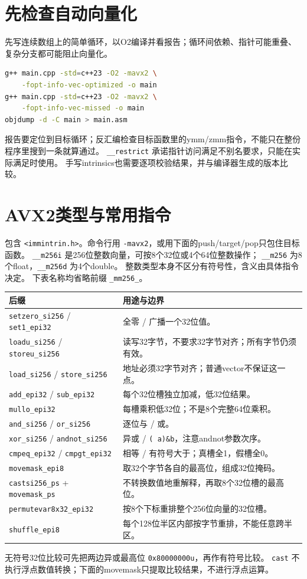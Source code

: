 \newpage
\section{先检查自动向量化}
先写连续数组上的简单循环，以O2编译并看报告；循环间依赖、指针可能重叠、复杂分支都可能阻止向量化。
\begin{lstlisting}[language=bash]
g++ main.cpp -std=c++23 -O2 -mavx2 \
    -fopt-info-vec-optimized -o main
g++ main.cpp -std=c++23 -O2 -mavx2 \
    -fopt-info-vec-missed -o main
objdump -d -C main > main.asm
\end{lstlisting}
报告要定位到目标循环；反汇编检查目标函数里的ymm/zmm指令，不能只在整份程序里搜到一条就算通过。
\texttt{\_\_restrict} 承诺指针访问满足不别名要求，只能在实际满足时使用。
手写intrinsics也需要逐项校验结果，并与编译器生成的版本比较。

\section{AVX2类型与常用指令}
包含 \texttt{<immintrin.h>}。命令行用 \texttt{-mavx2}，或用下面的push/target/pop只包住目标函数。
\texttt{\_\_m256i} 是256位整数向量，可按8个32位或4个64位整数操作；
\texttt{\_\_m256} 为8个float，\texttt{\_\_m256d} 为4个double。
整数类型本身不区分有符号性，含义由具体指令决定。
下表名称均省略前缀 \texttt{\_mm256\_}。
\begin{longtable}{p{65mm}p{94mm}}\toprule 后缀 & 用途与边界\\\midrule\endhead
\texttt{setzero\_si256} / \texttt{set1\_epi32} & 全零 / 广播一个32位值。\\
\texttt{loadu\_si256} / \texttt{storeu\_si256} & 读写32字节，不要求32字节对齐；所有字节仍须有效。\\
\texttt{load\_si256} / \texttt{store\_si256} & 地址必须32字节对齐；普通vector不保证这一点。\\
\texttt{add\_epi32} / \texttt{sub\_epi32} & 每个32位槽独立加减，低32位结果。\\
\texttt{mullo\_epi32} & 每槽乘积低32位；不是8个完整64位乘积。\\
\texttt{and\_si256} / \texttt{or\_si256} & 逐位与 / 或。\\
\texttt{xor\_si256} / \texttt{andnot\_si256} & 异或 / \texttt{(~a)\&b}，注意andnot参数次序。\\
\texttt{cmpeq\_epi32} / \texttt{cmpgt\_epi32} & 相等 / 有符号大于；真槽全1，假槽全0。\\
\texttt{movemask\_epi8} & 取32个字节各自的最高位，组成32位掩码。\\
\texttt{castsi256\_ps} + \texttt{movemask\_ps} & 不转换数值地重解释，再取8个32位槽的最高位。\\
\texttt{permutevar8x32\_epi32} & 按8个下标重排整个256位向量的32位槽。\\
\texttt{shuffle\_epi8} & 每个128位半区内部按字节重排，不能任意跨半区。\\\bottomrule
\end{longtable}
无符号32位比较可先把两边异或最高位 \texttt{0x80000000u}，再作有符号比较。
\texttt{cast} 不执行浮点数值转换；下面的movemask只提取比较结果，不进行浮点运算。

